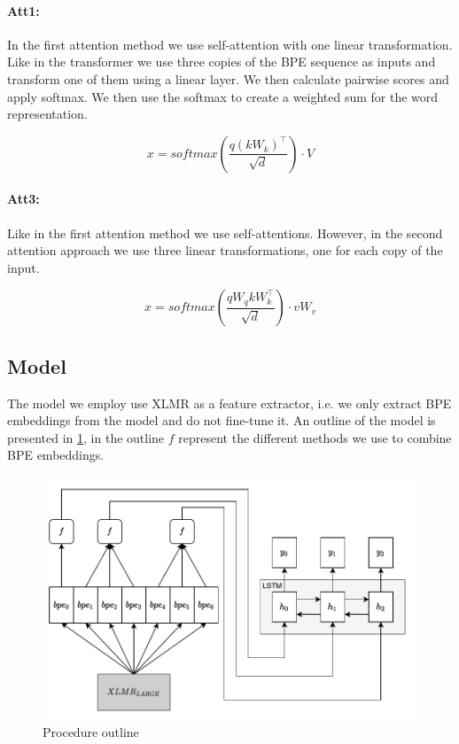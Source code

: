 \documentclass[11pt]{article}
\begin{document}
	\paragraph{Att1:} In the first attention method we use self-attention \citep{vaswani2017attention} with one linear transformation. Like in the transformer we use three copies of the BPE sequence as inputs and transform one of them using a linear layer.
	We then calculate pairwise scores and apply softmax. We then use the softmax to create a weighted sum for the word representation.
	
	\begin{equation}
	    x = softmax(\frac{q (kW_k)^\intercal}{\sqrt{d}}) \cdot V
	\end{equation}
	
	\paragraph{Att3:} Like in the first attention method we use self-attentions. However, in the second attention approach we use three linear transformations, one for each copy of the input. 
	
	\begin{equation}
	    x = softmax(\frac{qW_q kW_k ^\intercal}{\sqrt{d}}) \cdot vW_v
	\end{equation}
	
	\subsection{Model}
	The model we employ use XLMR as a feature extractor, i.e. we only extract BPE embeddings from the model and do not fine-tune it. 
	An outline of the model is presented in \cref{fig:model}, in the outline $f$ represent the different methods we use to combine BPE embeddings.
	
	\begin{figure}[h!]
		\centering
		\includegraphics[scale=0.2]{model_outline-5.pdf}
		\caption{\label{fig:model} Procedure outline}
	\end{figure}
	
\end{document}
